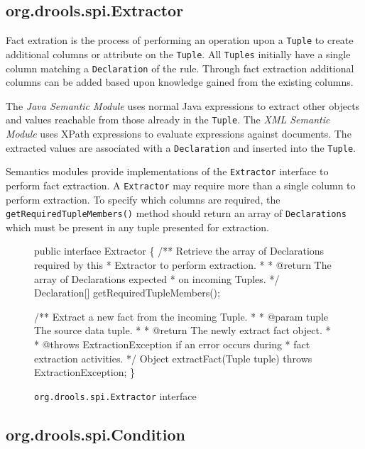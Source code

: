 \subsection{org.drools.spi.Extractor}

Fact extration is the process of performing an operation upon a
\verb|Tuple| to create additional columns or attribute on the
\verb|Tuple|.  All \verb|Tuples| initially have a single column
matching a \verb|Declaration| of the rule.  Through fact
extraction additional columns can be added based upon knowledge
gained from the existing columns.

The \emph{Java Semantic Module} uses normal Java expressions to
extract other objects and values reachable from those already in the
\verb|Tuple|.  The \emph{XML Semantic Module} uses
XPath\cite{clark99xpath} expressions
to evaluate expressions against documents.  The extracted values are
associated with a \verb|Declaration| and inserted into the
\verb|Tuple|.

Semantics modules provide implementations of the \verb|Extractor|
interface to perform fact extraction. A \verb|Extractor| may
require more than a single column to perform extraction.  To specify
which columns are required, the \verb|getRequiredTupleMembers()| 
method should return an array of \verb|Declarations| which must 
be present in any tuple presented for extraction.

\begin{figure}
\begin{codelisting}
public interface Extractor
\{
    /** Retrieve the array of Declarations required by this 
     *  Extractor to perform extraction.
     *
     *  @return The array of Declarations expected 
     *          on incoming Tuples.
     */
    Declaration[] getRequiredTupleMembers();

    /** Extract a new fact from the incoming Tuple.
     *
     *  @param tuple The source data tuple.
     *
     *  @return The newly extract fact object.
     *
     *  @throws ExtractionException if an error occurs during
     *          fact extraction activities.
     */
    Object extractFact(Tuple tuple) throws ExtractionException;
\}
\end{codelisting}
\label{code.Extractor}
\caption{\texttt{org.drools.spi.Extractor} interface}
\end{figure}

\subsection{org.drools.spi.Condition}

